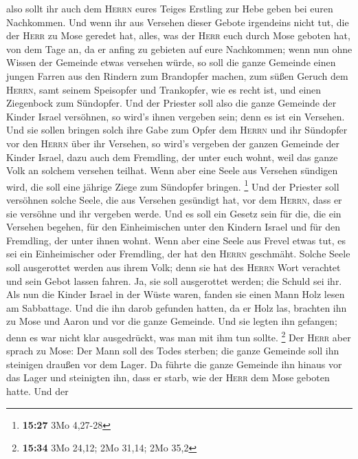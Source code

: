  also sollt ihr auch dem \textsc{Herrn} eures Teiges
Erstling zur Hebe geben bei euren Nachkommen.  Und wenn
ihr aus Versehen dieser Gebote irgendeins nicht tut, die der
\textsc{Herr} zu Mose geredet hat,  alles, was der
\textsc{Herr} euch durch Mose geboten hat, von dem Tage an, da er anfing
zu gebieten auf eure Nachkommen;  wenn nun ohne Wissen
der Gemeinde etwas versehen würde, so soll die ganze Gemeinde einen
jungen Farren aus den Rindern zum Brandopfer machen, zum süßen Geruch
dem \textsc{Herrn}, samt seinem Speisopfer und Trankopfer, wie es recht
ist, und einen Ziegenbock zum Sündopfer.  Und der
Priester soll also die ganze Gemeinde der Kinder Israel versöhnen, so
wird's ihnen vergeben sein; denn es ist ein Versehen. Und sie sollen
bringen solch ihre Gabe zum Opfer dem \textsc{Herrn} und ihr Sündopfer
vor den \textsc{Herrn} über ihr Versehen,  so wird's
vergeben der ganzen Gemeinde der Kinder Israel, dazu auch dem Fremdling,
der unter euch wohnt, weil das ganze Volk an solchem versehen teilhat.
 Wenn aber eine Seele aus Versehen sündigen wird, die
soll eine jährige Ziege zum Sündopfer bringen. \footnote{\textbf{15:27}
  3Mo 4,27-28}  Und der Priester soll versöhnen solche
Seele, die aus Versehen gesündigt hat, vor dem \textsc{Herrn}, dass er
sie versöhne und ihr vergeben werde.  Und es soll ein
Gesetz sein für die, die ein Versehen begehen, für den Einheimischen
unter den Kindern Israel und für den Fremdling, der unter ihnen wohnt.
 Wenn aber eine Seele aus Frevel etwas tut, es sei ein
Einheimischer oder Fremdling, der hat den \textsc{Herrn} geschmäht.
Solche Seele soll ausgerottet werden aus ihrem Volk; 
denn sie hat des \textsc{Herrn} Wort verachtet und sein Gebot lassen
fahren. Ja, sie soll ausgerottet werden; die Schuld sei ihr.
 Als nun die Kinder Israel in der Wüste waren, fanden sie
einen Mann Holz lesen am Sabbattage.  Und die ihn darob
gefunden hatten, da er Holz las, brachten ihn zu Mose und Aaron und vor
die ganze Gemeinde.  Und sie legten ihn gefangen; denn es
war nicht klar ausgedrückt, was man mit ihm tun sollte. \footnote{\textbf{15:34}
  3Mo 24,12; 2Mo 31,14; 2Mo 35,2}  Der \textsc{Herr} aber
sprach zu Mose: Der Mann soll des Todes sterben; die ganze Gemeinde soll
ihn steinigen draußen vor dem Lager.  Da führte die ganze
Gemeinde ihn hinaus vor das Lager und steinigten ihn, dass er starb, wie
der \textsc{Herr} dem Mose geboten hatte.  Und der
